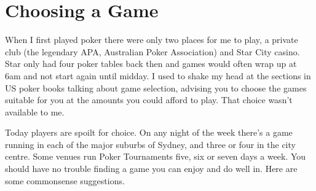 \chapter{Choosing a Game}


When I first played poker there were only two places for me to
play, a private club (the legendary APA, Australian Poker Association)
and Star City casino. Star only had four poker tables
back then and games would often wrap up at 6am and not start again
until midday. I used to shake my head at the sections in US poker
books talking about game selection, advising you to choose the games
suitable for you at the amounts you could afford to play. That choice
wasn't available to me.

Today players are spoilt for choice. On any night
of the week there's a game running in each of
the major suburbs of Sydney, and three or four in
the city centre. Some venues run Poker Tournaments five, six or seven
days a week. You should have no trouble finding a game
you can enjoy and do well in. Here are some commonsense
suggestions.

